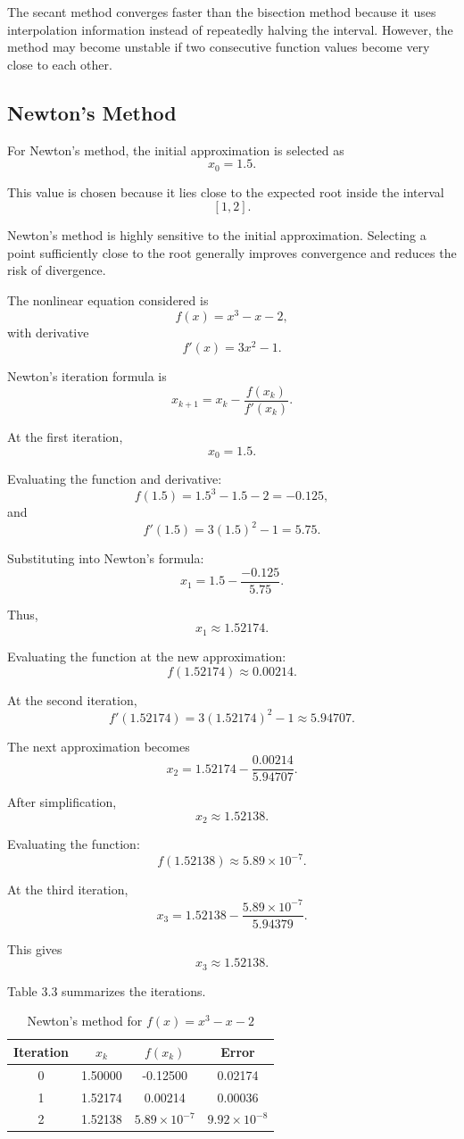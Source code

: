 The secant method converges faster than the bisection method because it uses interpolation information instead of repeatedly halving the interval. However, the method may become unstable if two consecutive function values become very close to each other.

\subsection{Newton's Method}

For Newton's method, the initial approximation is selected as
\[
x_0=1.5.
\]

This value is chosen because it lies close to the expected root inside the interval
\[
[1,2].
\]

Newton's method is highly sensitive to the initial approximation. Selecting a point sufficiently close to the root generally improves convergence and reduces the risk of divergence.

The nonlinear equation considered is
\[
f(x)=x^3-x-2,
\]
with derivative
\[
f'(x)=3x^2-1.
\]

Newton's iteration formula is
\[
x_{k+1}
=
x_k
-
\frac{f(x_k)}{f'(x_k)}.
\]

At the first iteration,
\[
x_0=1.5.
\]

Evaluating the function and derivative:
\[
f(1.5)
=
1.5^3-1.5-2
=
-0.125,
\]
and
\[
f'(1.5)
=
3(1.5)^2-1
=
5.75.
\]

Substituting into Newton's formula:
\[
x_1
=
1.5
-
\frac{-0.125}{5.75}.
\]

Thus,
\[
x_1
\approx
1.52174.
\]

Evaluating the function at the new approximation:
\[
f(1.52174)
\approx
0.00214.
\]

At the second iteration,
\[
f'(1.52174)
=
3(1.52174)^2-1
\approx
5.94707.
\]

The next approximation becomes
\[
x_2
=
1.52174
-
\frac{0.00214}{5.94707}.
\]

After simplification,
\[
x_2
\approx
1.52138.
\]

Evaluating the function:
\[
f(1.52138)
\approx
5.89\times10^{-7}.
\]

At the third iteration,
\[
x_3
=
1.52138
-
\frac{5.89\times10^{-7}}{5.94379}.
\]

This gives
\[
x_3
\approx
1.52138.
\]

Table 3.3 summarizes the iterations.

\begin{table}[h!]
\centering
\caption{Newton's method for \(f(x)=x^3-x-2\)}
\label{tab:newton_example}
\begin{tabular}{|c|c|c|c|}
\hline
Iteration & \(x_k\) & \(f(x_k)\) & Error \\ \hline
0 & 1.50000 & -0.12500 & 0.02174 \\ \hline
1 & 1.52174 & 0.00214 & 0.00036 \\ \hline
2 & 1.52138 & \(5.89\times10^{-7}\) & \(9.92\times10^{-8}\) \\ \hline
\end{tabular}
\end{table}

